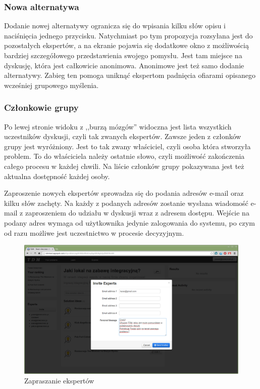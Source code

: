 \subsubsection{Nowa alternatywa}
Dodanie nowej alternatywy ogranicza się do wpisania kilku słów opisu i
naciśnięcia jednego przycisku. Natychmiast po tym propozycja rozsyłana jest do
pozostałych ekspertów, a na ekranie pojawia się dodatkowe okno z możliwością
bardziej szczegółowego przedstawienia swojego pomysłu. Jest tam miejsce na
dyskusję, która jest całkowicie anonimowa. Anonimowe jest też samo dodanie
alternatywy. Zabieg ten pomoga uniknąć ekspertom padnięcia ofiarami opisanego
wcześniej grupowego myślenia.

\subsubsection{Członkowie grupy}
Po lewej stronie widoku z ,,burzą mózgów'' widoczna jest lista wszystkich
uczestników dyskusji, czyli tak zwanych ekspertów. Zawsze jeden z członków grupy
jest wyróżniony. Jest to tak zwany właściciel, czyli osoba która stworzyła
problem. To do właściciela należy ostatnie słowo, czyli możliwość zakończenia
całego procesu w każdej chwili. Na liście członków grupy pokazywana jest też
aktualna dostępność każdej osoby.

Zaproszenie nowych ekspertów sprowadza się do podania adresów e-mail oraz kilku
słów zachęty. Na każdy z podanych adresów zostanie wysłana wiadomość e-mail z
zaproszeniem do udziału w dyskusji wraz z adresem dostępu. Wejście na podany
adres wymaga od użytkownika jedynie zalogowania do systemu, po czym od razu
możliwe jest uczestnictwo w procesie decyzyjnym.
\begin{figure}[!htbp]
  \includegraphics[width=\linewidth]
    {chapters/prototyp/tdm_invitation}
  \caption{Zapraszanie ekspertów}
  \label{fig:invitation}
\end{figure}
